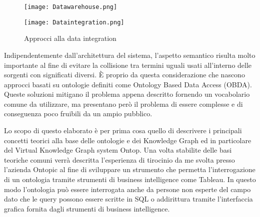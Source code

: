 \begin{figure}[ht]
    \centering
    \begin{minipage}{0.45\linewidth}
        \centering
        \texttt{[image: Datawarehouse.png]}
    \end{minipage}
    \begin{minipage}{0.45\linewidth}
        \centering
        \texttt{[image: Dataintegration.png]}
    \end{minipage}
    \caption{Approcci alla data integration}
    \label{fig:dataIntegration}
\end{figure}
Indipendentemente dall'architettura del sistema, l'aspetto semantico risulta molto importante al fine di evitare la collisione tra termini uguali usati all'interno delle sorgenti con significati
diversi. \`E proprio da questa considerazione che nascono approcci basati su ontologie definiti come Ontology Based Data Access (OBDA). Queste soluzioni mitigano il problema appena descritto fornendo un vocabolario 
comune da utilizzare, ma presentano però il problema di essere complesse e di conseguenza poco fruibili da un ampio pubblico.

Lo scopo di questo elaborato è per prima cosa quello di descrivere i principali concetti teorici alla base delle ontologie e dei Knowledge Graph ed in particolare del Virtual Knowledge Graph system Ontop. Una volta stabilite delle
basi teoriche comuni verrà descritta l'esperienza di tirocinio da me svolta presso l'azienda Ontopic al fine di sviluppare un strumento che permetta l'interrogazione di un ontologia tramite strumenti di business intelligence 
come Tableau. In questo modo l'ontologia può essere interrogata anche da persone non esperte del campo dato che le query possono essere scritte in SQL o addirittura tramite l'interfaccia grafica fornita dagli strumenti di 
business intelligence.